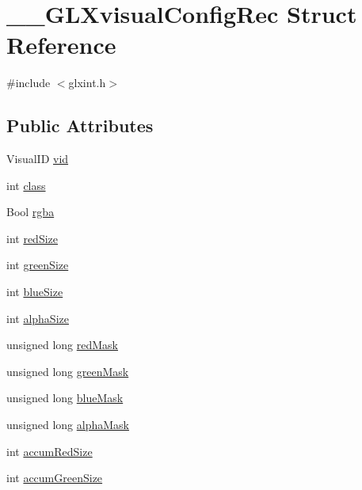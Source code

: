 \hypertarget{struct_____g_l_xvisual_config_rec}{}\section{\+\_\+\+\_\+\+G\+L\+Xvisual\+Config\+Rec Struct Reference}
\label{struct_____g_l_xvisual_config_rec}


{\ttfamily \#include $<$glxint.\+h$>$}

\subsection*{Public Attributes}
\begin{DoxyCompactItemize}
\item 
Visual\+ID \hyperlink{struct_____g_l_xvisual_config_rec_a949f3ecf49250026f5ec70d009a3fb17}{vid}
\item 
int \hyperlink{struct_____g_l_xvisual_config_rec_a12d60f95dae2b5506d8bf2038792409b}{class}
\item 
Bool \hyperlink{struct_____g_l_xvisual_config_rec_a838ce3b68e6cd82e8954085a50c6ced0}{rgba}
\item 
int \hyperlink{struct_____g_l_xvisual_config_rec_a07bd36f0d94c27fa325cdab07566eb87}{red\+Size}
\item 
int \hyperlink{struct_____g_l_xvisual_config_rec_ae13c49e429f939f9405c8f26ae6aa4c8}{green\+Size}
\item 
int \hyperlink{struct_____g_l_xvisual_config_rec_abfe68c39ec9fb55df8b3860b56e9db82}{blue\+Size}
\item 
int \hyperlink{struct_____g_l_xvisual_config_rec_afaf89bec39275bc3d44a31684d95cc3b}{alpha\+Size}
\item 
unsigned long \hyperlink{struct_____g_l_xvisual_config_rec_aa0535b0273f39f7d8429a148e84ef8a5}{red\+Mask}
\item 
unsigned long \hyperlink{struct_____g_l_xvisual_config_rec_a05e93a68206e125b4dc776699d21213d}{green\+Mask}
\item 
unsigned long \hyperlink{struct_____g_l_xvisual_config_rec_ac5a3b95b65176bc8722778f544f9c3e1}{blue\+Mask}
\item 
unsigned long \hyperlink{struct_____g_l_xvisual_config_rec_a63751043d3398cbaa2f68886ccf46423}{alpha\+Mask}
\item 
int \hyperlink{struct_____g_l_xvisual_config_rec_afc89476f94fc06bcd7ce7ded9fb17baf}{accum\+Red\+Size}
\item 
int \hyperlink{struct_____g_l_xvisual_config_rec_a5a3efce1125eaff24702c8a9d5108dc8}{accum\+Green\+Size}

\end{DoxyCompactItemize}
